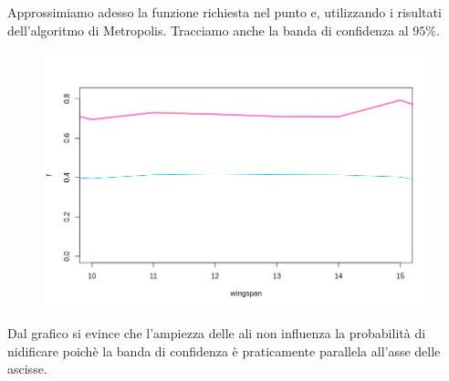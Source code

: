   Approssimiamo adesso la funzione richiesta nel punto e, utilizzando i risultati dell'algoritmo di Metropolis. Tracciamo anche la banda di confidenza al $95\%$.
  \begin{figure}[h!]
    \centering
    \includegraphics[width=0.7\linewidth]{img/esercizio10-2-4}
    \caption{}
    \label{fig:metropolis4}
  \end{figure}
  
  Dal grafico si evince che l'ampiezza delle ali non influenza la probabilità di nidificare poichè la banda di confidenza è praticamente parallela all'asse delle ascisse.
  
  